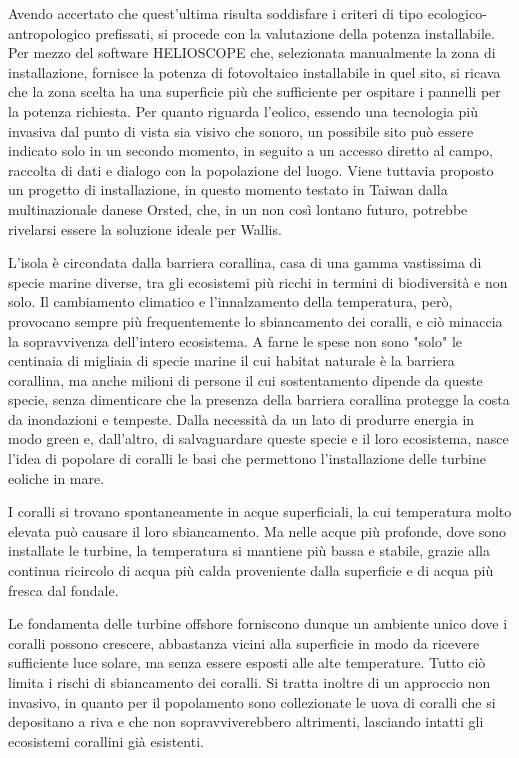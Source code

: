 Avendo accertato che quest'ultima risulta soddisfare i criteri di tipo ecologico-antropologico prefissati, si procede con la valutazione della potenza installabile. 
Per mezzo del software HELIOSCOPE che, selezionata manualmente la zona di installazione, fornisce la potenza di fotovoltaico installabile in quel sito, si ricava che la zona scelta ha una superficie più che sufficiente per ospitare i pannelli per la potenza richiesta.
Per quanto riguarda l'eolico, essendo una tecnologia più invasiva dal punto di vista sia visivo che sonoro, un possibile sito può essere indicato solo in un secondo momento, in seguito a un accesso diretto al campo, raccolta di dati e dialogo con la popolazione del luogo. 
Viene tuttavia proposto un progetto di installazione, in questo momento testato in Taiwan dalla multinazionale danese Orsted, che, in un non così lontano futuro, potrebbe rivelarsi essere la soluzione ideale per Wallis.

L'isola è circondata dalla barriera corallina, casa di una gamma vastissima di specie marine diverse, tra gli ecosistemi più ricchi in termini di biodiversità e non solo.
Il cambiamento climatico e l'innalzamento della temperatura, però, provocano sempre più frequentemente lo sbiancamento dei coralli, e ciò minaccia la sopravvivenza dell'intero ecosistema. 
A farne le spese non sono "solo" le centinaia di migliaia di specie marine il cui habitat naturale è la barriera corallina, ma anche milioni di persone il cui sostentamento dipende da queste specie, senza dimenticare che la presenza della barriera corallina protegge la costa da inondazioni e tempeste. 
Dalla necessità da un lato di produrre energia in modo green e, dall'altro, di salvaguardare queste specie e il loro ecosistema, nasce l'idea di popolare di coralli le basi che permettono l'installazione delle turbine eoliche in mare.

I coralli si trovano spontaneamente in acque superficiali, la cui temperatura molto elevata può causare il loro sbiancamento. 
Ma nelle acque più profonde, dove sono installate le turbine, la temperatura si mantiene più bassa e stabile, grazie alla continua ricircolo di acqua più calda proveniente dalla superficie e di acqua più fresca dal fondale.

Le fondamenta delle turbine offshore forniscono dunque un ambiente unico dove i coralli possono crescere, abbastanza vicini alla superficie in modo da ricevere sufficiente luce solare, ma senza essere esposti alle alte temperature. 
Tutto ciò limita i rischi di sbiancamento dei coralli.
Si tratta inoltre di un approccio non invasivo, in quanto per il popolamento sono collezionate le uova di coralli che si depositano a riva e che non sopravviverebbero altrimenti, lasciando intatti gli ecosistemi corallini già esistenti.


